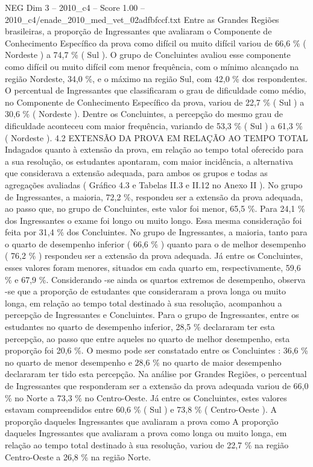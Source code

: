 \begin{textsample}{NEG Dim 3 – 2010\_c4 – Score 1.00 – 2010\_c4/enade\_2010\_med\_vet\_02adfbfccf.txt}
Entre as Grandes Regiões brasileiras, a proporção de Ingressantes que avaliaram o Componente de Conhecimento Específico da prova como difícil ou muito difícil variou de 66,6 \% ( Nordeste ) a 74,7 \% ( Sul ).
O grupo de Concluintes avaliou esse componente como difícil ou muito difícil com menor frequência, com o mínimo alcançado na região Nordeste, 34,0 \%, e o máximo na região Sul, com 42,0 \% dos respondentes.
O percentual de Ingressantes que classificaram o grau de dificuldade como médio, no Componente de Conhecimento Específico da prova, variou de 22,7 \% ( Sul ) a 30,6 \% ( Nordeste ).
Dentre os Concluintes, a percepção do mesmo grau de dificuldade aconteceu com maior frequência, variando de 53,3 \% ( Sul ) a 61,3 \% ( Nordeste ). 4.2 EXTENSÃO DA PROVA EM RELAÇÃO AO TEMPO TOTAL Indagados quanto à extensão da prova, em relação ao tempo total oferecido para a sua resolução, os estudantes apontaram, com maior incidência, a alternativa que considerava a extensão adequada, para ambos os grupos e todas as agregações avaliadas ( Gráfico 4.3 e Tabelas II.3 e II.12 no Anexo II ).
No grupo de Ingressantes, a maioria, 72,2 \%, respondeu ser a extensão da prova adequada, ao passo que, no grupo de Concluintes, este valor foi menor, 65,5 \%.
Para 24,1 \% dos Ingressantes o exame foi longo ou muito longo.
Essa mesma consideração foi feita por 31,4 \% dos Concluintes.
No grupo de Ingressantes, a maioria, tanto para o quarto de desempenho inferior ( 66,6 \% ) quanto para o de melhor desempenho ( 76,2 \% ) respondeu ser a extensão da prova adequada.
Já entre os Concluintes, esses valores foram menores, situados em cada quarto em, respectivamente, 59,6 \% e 67,9 \%.
Considerando -se ainda os quartos extremos de desempenho, observa -se que a proporção de estudantes que consideraram a prova longa ou muito longa, em relação ao tempo total destinado à sua resolução, acompanhou a percepção de Ingressantes e Concluintes.
Para o grupo de Ingressantes, entre os estudantes no quarto de desempenho inferior, 28,5 \% declararam ter esta percepção, ao passo que entre aqueles no quarto de melhor desempenho, esta proporção foi 20,6 \%.
O mesmo pode ser constatado entre os Concluintes : 36,6 \% no quarto de menor desempenho e 28,6 \% no quarto de maior desempenho declararam ter tido esta percepção.
Na análise por Grandes Regiões, o percentual de Ingressantes que responderam ser a extensão da prova adequada variou de 66,0 \% no Norte a 73,3 \% no Centro-Oeste.
Já entre os Concluintes, estes valores estavam compreendidos entre 60,6 \% ( Sul ) e 73,8 \% ( Centro-Oeste ).
A proporção daqueles Ingressantes que avaliaram a prova como A proporção daqueles Ingressantes que avaliaram a prova como longa ou muito longa, em relação ao tempo total destinado à sua resolução, variou de 22,7 \% na região Centro-Oeste a 26,8 \% na região Norte.

\end{textsample}
